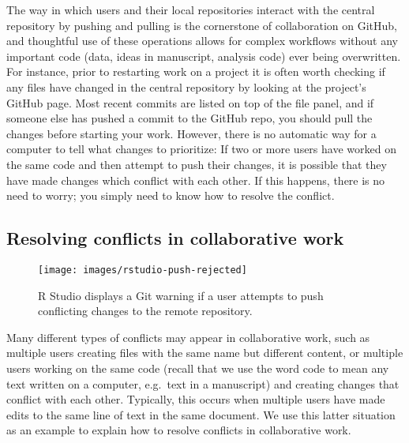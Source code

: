 \documentclass[
  american,
  ,doc,floatsintext]{apa6}
\begin{document}
The way in which users and their local repositories interact with the central repository by pushing and pulling is the cornerstone of collaboration on GitHub, and thoughtful use of these operations allows for complex workflows without any important code (data, ideas in manuscript, analysis code) ever being overwritten. For instance, prior to restarting work on a project it is often worth checking if any files have changed in the central repository by looking at the project's GitHub page. Most recent commits are listed on top of the file panel, and if someone else has pushed a commit to the GitHub repo, you should pull the changes before starting your work. However, there is no automatic way for a computer to tell what changes to prioritize: If two or more users have worked on the same code and then attempt to push their changes, it is possible that they have made changes which conflict with each other. If this happens, there is no need to worry; you simply need to know how to resolve the conflict.

\hypertarget{resolving-conflicts-in-collaborative-work}{%
\subsection{Resolving conflicts in collaborative work}\label{resolving-conflicts-in-collaborative-work}}

\begin{figure}

{\centering \texttt{[image: images/rstudio-push-rejected]} 

}

\caption{R Studio displays a Git warning if a user attempts to push conflicting changes to the remote repository.}\label{fig:rstudio-push-rejected}
\end{figure}

Many different types of conflicts may appear in collaborative work, such as multiple users creating files with the same name but different content, or multiple users working on the same code (recall that we use the word code to mean any text written on a computer, e.g.~text in a manuscript) and creating changes that conflict with each other. Typically, this occurs when multiple users have made edits to the same line of text in the same document. We use this latter situation as an example to explain how to resolve conflicts in collaborative work.
\end{document}
